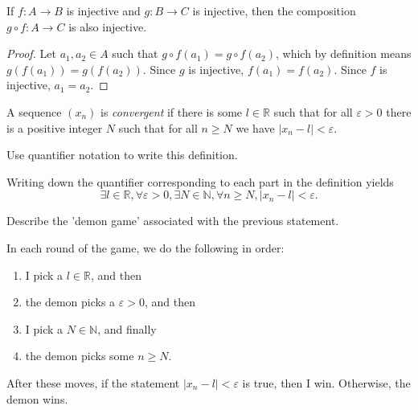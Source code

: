 \documentclass[12pt]{article}
\begin{document}
\begin{question}
    If $f: A \to B$ is injective and $g: B \to C$ is injective,
    then the composition $g \circ f : A \to C$ is also injective.
\end{question}
\begin{proof}
    Let $a_{1},a_{2} \in A$ such that $g \circ f(a_{1}) = g \circ f(a_{2})$,
    which by definition means $g(f(a_{1})) = g(f(a_{2}))$.
    Since $g$ is injective, $f(a_{1}) = f(a_{2})$.
    Since $f$ is injective, $a_{1} = a_{2}$.
\end{proof}

\begin{question}
    A sequence $(x_n)$ is \emph{convergent} if 
    there is some $l \in \mathbb{R}$ such that for all $\varepsilon > 0$
    there is a positive integer $N$ such that
    for all $n \ge N$ we have $|x_n - l| < \varepsilon $.
\end{question}

\begin{subquestion}
    Use quantifier notation to write this definition.
\end{subquestion}

Writing down the quantifier corresponding to each part in the definition yields
\[
\exists l\in \mathbb{R},\forall \varepsilon > 0,\exists N \in \mathbb{N},\forall n \ge N, |x_n - l| < \varepsilon.
\]
\begin{subquestion}
    Describe the 'demon game' associated with the previous statement.
\end{subquestion}

\noindent In each round of the game, we do the following in order:
\begin{enumerate}[noitemsep]
    \item I pick a $l \in \mathbb{R}$, and then
    \item the demon picks a $\varepsilon > 0$, and then
    \item I pick a $N \in \mathbb{N}$, and finally
    \item the demon picks some $n \ge N$.
\end{enumerate}
After these moves, if the statement $|x_n - l| < \varepsilon$ is true, 
then I win. Otherwise, the demon wins.
\end{document}
